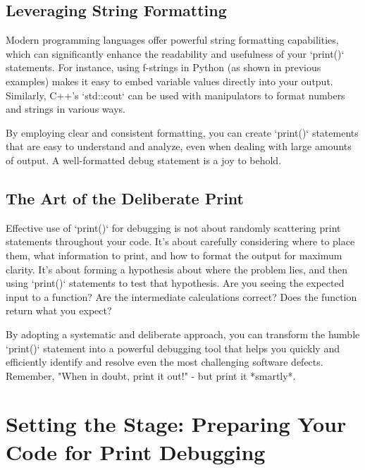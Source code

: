 \documentclass{article}
\begin{document}
\subsection*{Leveraging String Formatting}

Modern programming languages offer powerful string formatting capabilities, which can significantly enhance the readability and usefulness of your `print()` statements.  For instance, using f-strings in Python (as shown in previous examples) makes it easy to embed variable values directly into your output.  Similarly, C++'s `std::cout` can be used with manipulators to format numbers and strings in various ways.

By employing clear and consistent formatting, you can create `print()` statements that are easy to understand and analyze, even when dealing with large amounts of output.  A well-formatted debug statement is a joy to behold.

\subsection*{The Art of the Deliberate Print}

Effective use of `print()` for debugging is not about randomly scattering print statements throughout your code. It's about carefully considering where to place them, what information to print, and how to format the output for maximum clarity.  It's about forming a hypothesis about where the problem lies, and then using `print()` statements to test that hypothesis. Are you seeing the expected input to a function? Are the intermediate calculations correct? Does the function return what you expect?

By adopting a systematic and deliberate approach, you can transform the humble `print()` statement into a powerful debugging tool that helps you quickly and efficiently identify and resolve even the most challenging software defects. Remember, "When in doubt, print it out!" - but print it *smartly*.

\newpage

\section*{Setting the Stage: Preparing Your Code for Print Debugging} %
\label{chapter-2-5-Setting_the_Stage__Preparing_Your_Code_f}
\end{document}
